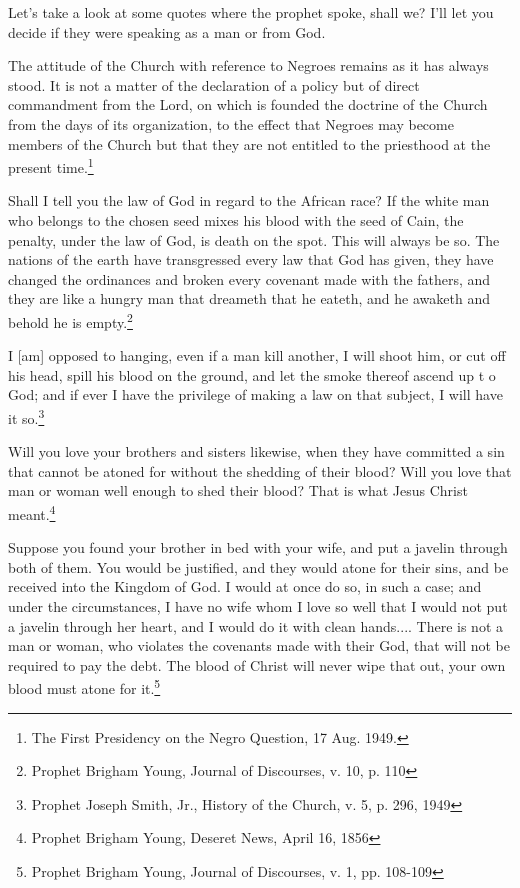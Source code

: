 Let's take a look at some quotes where the prophet spoke, shall we? I'll let you
decide if they were speaking as a man or from God.

\begin{displayquote}
The attitude of the Church with reference to Negroes remains as it has always 
stood. It is not a matter of the declaration of a policy but of direct commandment 
from the Lord, on which is founded the doctrine of the Church from the days of 
its organization, to the effect that Negroes may become members of the Church 
but that they are not entitled to the priesthood at the present time.\footnote{
The First Presidency on the Negro Question, 17 Aug. 1949.
}
\end{displayquote}

\begin{displayquote}
Shall I tell you the law of God in regard to the African race? If the white man 
who belongs to the chosen seed mixes his blood with the seed of Cain, the penalty, 
under the law of God, is death on the spot. This will always be so. The nations of 
the earth have transgressed every law that God has given, they have changed the 
ordinances and broken every covenant made with the fathers, and they are like a 
hungry man that dreameth that he eateth, and he awaketh and behold he is
empty.\footnote{Prophet Brigham Young, Journal of Discourses, v. 10, p. 110}
\end{displayquote}

\begin{displayquote}
I [am] opposed to hanging, even if a man kill another, I will shoot him, or cut 
off his head, spill his blood on the ground, and let the smoke thereof ascend up t
o God; and if ever I have the privilege of making a law on that subject, 
I will have it so.\footnote{Prophet Joseph Smith, Jr., History of the Church, v. 
5, p. 296, 1949}
\end{displayquote}

\begin{displayquote}
Will you love your brothers and sisters likewise, when they have committed a sin 
that cannot be atoned for without the shedding of their blood? Will you love that 
man or woman well enough to shed their blood? That is what Jesus Christ
meant.\footnote{Prophet Brigham Young, Deseret News, April 16, 1856}
\end{displayquote}

\begin{displayquote}
Suppose you found your brother in bed with your wife, and put a javelin through 
both of them. You would be justified, and they would atone for their sins, and be 
received into the Kingdom of God. I would at once do so, in such a case; and under 
the circumstances, I have no wife whom I love so well that I would not put a 
javelin through her heart, and I would do it with clean hands.... There is not a 
man or woman, who violates the covenants made with their God, that will not be 
required to pay the debt. The blood of Christ will never wipe that out, your own 
blood must atone for it.\footnote{Prophet Brigham Young, Journal of Discourses, v. 
1, pp. 108-109}
\end{displayquote}

